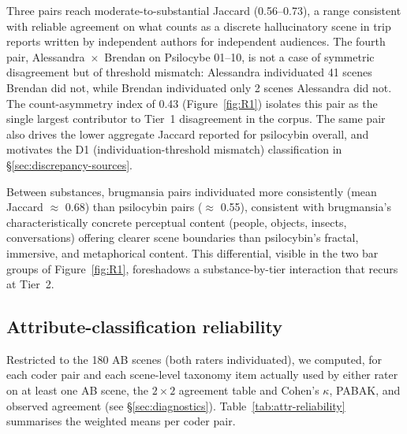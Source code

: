 Three pairs reach moderate-to-substantial Jaccard (0.56--0.73), a range consistent with reliable agreement on what counts as a discrete hallucinatory scene in trip reports written by independent authors for independent audiences. The fourth pair, Alessandra~$\times$~Brendan on Psilocybe 01--10, is not a case of symmetric disagreement but of threshold mismatch: Alessandra individuated 41 scenes Brendan did not, while Brendan individuated only 2 scenes Alessandra did not. The count-asymmetry index of 0.43 (Figure~\ref{fig:R1}) isolates this pair as the single largest contributor to Tier~1 disagreement in the corpus. The same pair also drives the lower aggregate Jaccard reported for psilocybin overall, and motivates the D1 (individuation-threshold mismatch) classification in \S\ref{sec:discrepancy-sources}.

Between substances, brugmansia pairs individuated more consistently (mean Jaccard $\approx$ 0.68) than psilocybin pairs ($\approx$ 0.55), consistent with brugmansia's characteristically concrete perceptual content (people, objects, insects, conversations) offering clearer scene boundaries than psilocybin's fractal, immersive, and metaphorical content. This differential, visible in the two bar groups of Figure~\ref{fig:R1}, foreshadows a substance-by-tier interaction that recurs at Tier~2.

\subsection{Attribute-classification reliability}
\label{sec:r-classification}

Restricted to the 180 AB scenes (both raters individuated), we computed, for each coder pair and each scene-level taxonomy item actually used by either rater on at least one AB scene, the $2\times 2$ agreement table and Cohen's $\kappa$, PABAK, and observed agreement (see \S\ref{sec:diagnostics}). Table~\ref{tab:attr-reliability} summarises the weighted means per coder pair.

